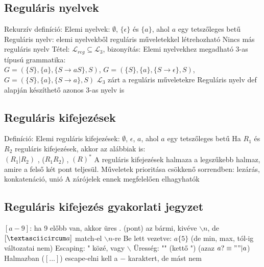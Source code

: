 \documentclass[12pt,a4paper]{article}
\begin{document}
\subsection{Reguláris nyelvek}

\begin{outline}
	\1 Rekurzív definíció:
		\2 Elemi nyelvek: $\emptyset$, $\{\epsilon\}$ és $\{a\}$, ahol $a$ egy tetszőleges betű
		\2 Reguláris nyelv: elemi nyelvekből reguláris műveletekkel létrehozható
		\2 Nincs más reguláris nyelv
	\1 Tétel: $\mathcal{L}_{reg} \subseteq \mathcal{L}_3$, bizonyítás:
		\2 Elemi nyelvekhez megadható $3$-as típusú grammatika:\\
		$G=(\{S\}, \{a\}, \{S \to aS\},
		S)$, $G=(\{S\}, \{a\}, \{S \to \epsilon\}, S)$,\\
		$G=(\{S\}, \{a\}, \{S \to a\}, S)$
		\2 $\mathcal{L}_3$ zárt a reguláris műveletekre
		\2 Reguláris nyelv def alapján készíthető azonos 3-as nyelv is
\end{outline}

\subsection{Reguláris kifejezések}

\begin{outline}
	\1 Definíció:
		\2 Elemi reguláris kifejezések: $\emptyset$, $\epsilon$, $a$, ahol $a$ egy tetszőleges betű
		\2 Ha $R_1$ és $R_2$ reguláris kifejezések, akkor az alábbiak is:\\
	$(R_1 | R_2)$ \;,\; ($R_1R_2$) \;,\; $(R)^*$
		\2 A reguláris kifejezések halmaza a legszűkebb halmaz, amire a felső két pont teljesül.
	\1 Műveletek prioritása csökkenő sorrendben: lezárás, konkatenáció, unió
		\2 A zárójelek ennek megfelelően elhagyhatók
\end{outline}

\pagebreak

\subsection{Reguláris kifejezés gyakorlati jegyzet}

\begin{outline}
	\1 $[a-9]$: ha 9 előbb van, akkor üres
	\1 $.$ (pont) az bármi, kivéve $\backslash n$, de $[\textasciicircum a]$ match-el $\backslash n$-re
	\1 Be lett vezetve: $a\{5\}$ (de min, max, tól-ig változatai nem)
	\1 Escaping: " közé, vagy $\backslash$
	\1 Üresség: "" (kettő ") \;\; (azaz $a? \equiv ""|a$)
	\1 Halmazban ($[...]$) escape-elni kell a $-$ karaktert, de mást nem
\end{outline}
\end{document}
